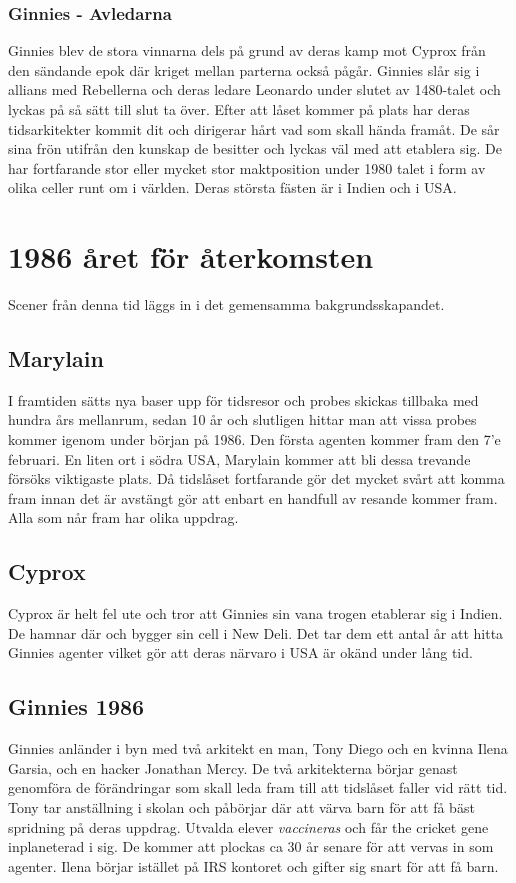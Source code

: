 \documentclass[a5paper,10pt]{report}
\begin{document}
\subsection{Ginnies - Avledarna}
Ginnies blev de stora vinnarna dels på grund av deras kamp mot Cyprox från den sändande epok där kriget mellan parterna också pågår. Ginnies slår sig i allians med Rebellerna och deras ledare Leonardo under slutet av 1480-talet och lyckas på så sätt till slut ta över. Efter att låset kommer på plats har deras tidsarkitekter kommit dit och dirigerar hårt vad som skall hända framåt. De sår sina frön utifrån den kunskap de besitter och lyckas väl med att etablera sig. De har fortfarande stor eller mycket stor maktposition under 1980 talet i form av olika celler runt om i världen. Deras största fästen är i Indien och i USA.
\chapter{1986 året för återkomsten}
Scener från denna tid läggs in i det gemensamma bakgrundsskapandet.
\section{Marylain}
I framtiden sätts nya baser upp för tidsresor och probes skickas tillbaka med hundra års mellanrum, sedan 10 år och slutligen hittar man att vissa probes kommer igenom under början på 1986. Den första agenten kommer fram den 7'e februari. En liten ort i södra USA, Marylain kommer att bli dessa trevande försöks viktigaste plats. Då tidslåset fortfarande gör det mycket svårt att komma fram innan det är avstängt gör att enbart en handfull av resande kommer fram. Alla som når fram har olika uppdrag.
\section{Cyprox}
Cyprox är helt fel ute och tror att Ginnies sin vana trogen etablerar sig i Indien. De hamnar där och bygger sin cell i New Deli. Det tar dem ett antal år att hitta Ginnies agenter vilket gör att deras närvaro i USA är okänd under lång tid.
\section{Ginnies 1986}
Ginnies anländer i byn med två arkitekt en man, Tony Diego och en kvinna Ilena Garsia, och en hacker Jonathan Mercy. De två arkitekterna börjar genast genomföra de förändringar som skall leda fram till att tidslåset faller vid rätt tid. Tony tar anställning i skolan och påbörjar där att värva barn för att få bäst spridning på deras uppdrag. Utvalda elever \textit{vaccineras} och får the cricket gene inplaneterad i sig. De kommer att plockas ca 30 år senare för att vervas in som agenter. Ilena börjar istället på IRS kontoret och gifter sig snart för att få barn.
\end{document}
